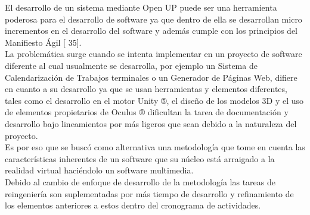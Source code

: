 El desarrollo de un sistema mediante Open UP puede ser una herramienta poderosa para el desarrollo de software ya que dentro de ella se desarrollan micro incrementos en el desarrollo del software y además cumple con los principios del Manifiesto Ágil [ 35].\\

La problemática surge cuando se intenta implementar en un proyecto de software diferente al cual usualmente se desarrolla, por ejemplo un Sistema de Calendarización de Trabajos terminales o un Generador de Páginas Web, difiere en cuanto a su desarrollo ya que se usan herramientas y elementos diferentes, tales como el desarrollo en el motor Unity ®, el diseño de los modelos 3D y el uso de elementos propietarios de Oculus ® dificultan la tarea de documentación y desarrollo bajo lineamientos por más ligeros que sean debido a la naturaleza del proyecto.\\

Es por eso que se buscó como alternativa una metodología que tome en cuenta las características inherentes de un software que su núcleo está arraigado a la realidad virtual haciéndolo un software multimedia.\\

Debido al cambio de enfoque de desarrollo de la metodología las tareas de reingeniería son suplementadas por más tiempo de desarrollo y refinamiento de los elementos anteriores a estos dentro del cronograma de actividades.\\


